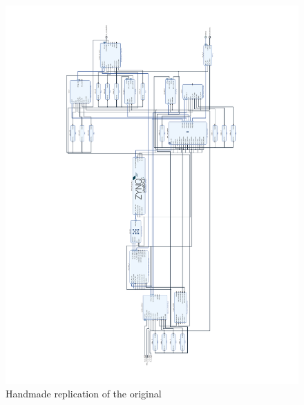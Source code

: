 \begin{figure}
    \centering
    \includegraphics[width=\linewidth]{assets/handmade_1.pdf}
    \caption{Handmade replication of the original}
    \label{fig:4_cam_handmade}
\end{figure}

